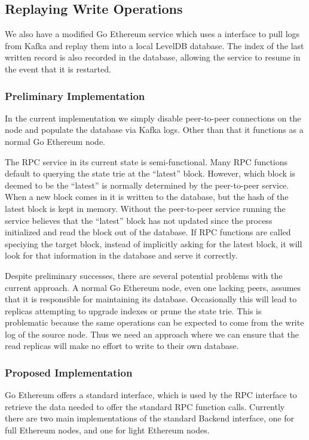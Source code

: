 \documentclass[letterpaper,10pt,english]{sphinxmanual}
\begin{document}
\subsection{Replaying Write Operations}
\label{\detokenize{topics/approach:replaying-write-operations}}
We also have a modified Go Ethereum service which uses a 
interface to pull logs from Kafka and replay them into a local LevelDB
database. The index of the last written record is also recorded in the
database, allowing the service to resume in the event that it is restarted.


\subsubsection{Preliminary Implementation}
\label{\detokenize{topics/approach:preliminary-implementation}}
In the current implementation we simply disable peer-to-peer connections on the
node and populate the database via Kafka logs. Other than that it functions as
a normal Go Ethereum node.

The RPC service in its current state is semi-functional. Many RPC functions
default to querying the state trie at the “latest” block. However, which block
is deemed to be the “latest” is normally determined by the peer-to-peer
service. When a new block comes in it is written to the database, but the hash
of the latest block is kept in memory. Without the peer-to-peer service running
the service believes that the “latest” block has not updated since the process
initialized and read the block out of the database. If RPC functions are called
speciying the target block, instead of implicitly asking for the latest block,
it will look for that information in the database and serve it correctly.

Despite preliminary successes, there are several potential problems with the
current approach. A normal Go Ethereum node, even one lacking peers, assumes
that it is responsible for maintaining its database. Occasionally this will
lead to replicas attempting to upgrade indexes or prune the state trie. This is
problematic because the same operations can be expected to come from the write
log of the source node. Thus we need an approach where we can ensure that the
read replicas will make no effort to write to their own database.


\subsubsection{Proposed Implementation}
\label{\detokenize{topics/approach:proposed-implementation}}
Go Ethereum offers a standard  interface, which is used by the RPC
interface to retrieve the data needed to offer the standard RPC function calls.
Currently there are two main implementations of the standard Backend interface,
one for full Ethereum nodes, and one for light Ethereum nodes.
\end{document}
